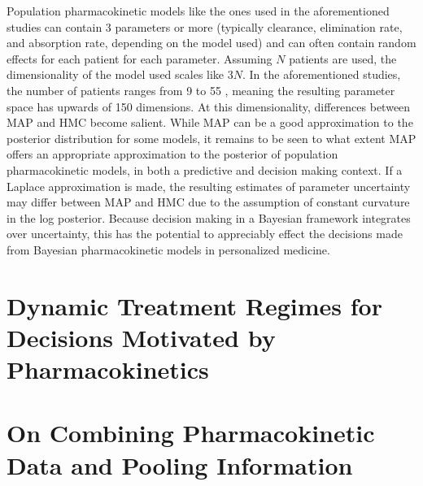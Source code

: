 Population pharmacokinetic models like the ones used in the aforementioned studies can contain 3 parameters or more (typically clearance, elimination rate, and absorption rate, depending on the model used) and can often contain random effects for each patient for each parameter.  Assuming $N$ patients are used, the dimensionality of the model used scales like $3N$.  In the aforementioned studies, the number of patients ranges from 9 \cite{gibert2022development}to 55 \cite{sturkenboom2015pharmacokinetic}, meaning the resulting parameter space has upwards of 150 dimensions.  At this dimensionality, differences between MAP and HMC become salient. While MAP can be a good approximation to the posterior distribution for some models, it remains to be seen to what extent MAP offers an appropriate approximation to the posterior of population pharmacokinetic models, in both a predictive and decision making context.  If a Laplace approximation is made, the resulting estimates of parameter uncertainty may differ between MAP and HMC due to the assumption of constant curvature in the log posterior.  Because decision making in a Bayesian framework integrates over uncertainty, this has the potential to appreciably effect the decisions made from Bayesian pharmacokinetic models in personalized medicine.

\section{Dynamic Treatment Regimes for Decisions Motivated by Pharmacokinetics}

\section{On Combining Pharmacokinetic Data and Pooling Information}